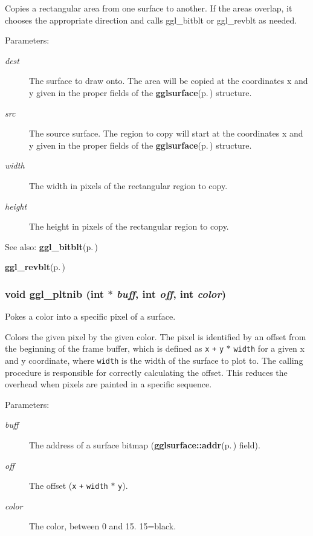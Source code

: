 Copies a rectangular area from one surface to another. If the areas overlap, it chooses the appropriate direction and calls ggl\_\-bitblt or ggl\_\-revblt as needed.

\begin{Desc}
\item[Parameters:]
\begin{description}
\item[{\em dest}]The surface to draw onto. The area will be copied at the coordinates x and y given in the proper fields of the {\bf gglsurface}{\rm (p.\,\pageref{structgglsurface})} structure. \item[{\em src}]The source surface. The region to copy will start at the coordinates x and y given in the proper fields of the {\bf gglsurface}{\rm (p.\,\pageref{structgglsurface})} structure. \item[{\em width}]The width in pixels of the rectangular region to copy. \item[{\em height}]The height in pixels of the rectangular region to copy.\end{description}
\end{Desc}
\begin{Desc}
\item[See also:]{\bf ggl\_\-bitblt}{\rm (p.\,\pageref{ggl_8h_a19})} 

{\bf ggl\_\-revblt}{\rm (p.\,\pageref{ggl_8h_a20})} \end{Desc}
\subsubsection{\setlength{\rightskip}{0pt plus 5cm}void ggl\_\-pltnib (int $\ast$ {\em buff}, int {\em off}, int {\em color})}\label{ggl_8h_a13}


Pokes a color into a specific pixel of a surface. 

Colors the given pixel by the given color. The pixel is identified by an offset from the beginning of the frame buffer, which is defined as {\tt x} {\tt +} {\tt y} {\tt $\ast$} {\tt width} for a given x and y coordinate, where {\tt width} is the width of the surface to plot to. The calling procedure is responsible for correctly calculating the offset. This reduces the overhead when pixels are painted in a specific sequence.

\begin{Desc}
\item[Parameters:]
\begin{description}
\item[{\em buff}]The address of a surface bitmap ({\bf gglsurface::addr}{\rm (p.\,\pageref{structgglsurface_o0})} field). \item[{\em off}]The offset ({\tt x} {\tt +} {\tt width} {\tt $\ast$} {\tt y}). \item[{\em color}]The color, between 0 and 15. 15=black. \end{description}
\end{Desc}
